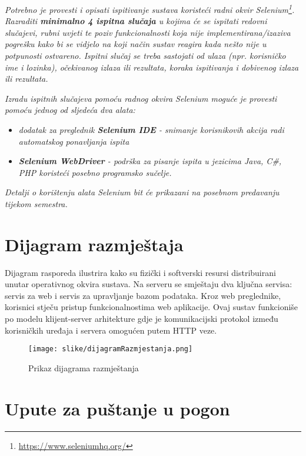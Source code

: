 			 \textit{Potrebno je provesti i opisati ispitivanje sustava koristeći radni okvir Selenium\footnote{\url{https://www.seleniumhq.org/}}. Razraditi \textbf{minimalno 4 ispitna slučaja} u kojima će se ispitati redovni slučajevi, rubni uvjeti te poziv funkcionalnosti koja nije implementirana/izaziva pogrešku kako bi se vidjelo na koji način sustav reagira kada nešto nije u potpunosti ostvareno. Ispitni slučaj se treba sastojati od ulaza (npr. korisničko ime i lozinka), očekivanog izlaza ili rezultata, koraka ispitivanja i dobivenog izlaza ili rezultata.\\ }
			 
			 \textit{Izradu ispitnih slučajeva pomoću radnog okvira Selenium moguće je provesti pomoću jednog od sljedeća dva alata:}
			 \begin{itemize}
			 	\item \textit{dodatak za preglednik \textbf{Selenium IDE} - snimanje korisnikovih akcija radi automatskog ponavljanja ispita	}
			 	\item \textit{\textbf{Selenium WebDriver} - podrška za pisanje ispita u jezicima Java, C\#, PHP koristeći posebno programsko sučelje.}
			 \end{itemize}
		 	\textit{Detalji o korištenju alata Selenium bit će prikazani na posebnom predavanju tijekom semestra.}
			
			\eject 
		
		
		\section{Dijagram razmještaja}
			
			Dijagram rasporeda ilustrira kako su fizički i softverski resursi distribuirani unutar operativnog okvira sustava. Na serveru se smještaju dva ključna servisa: servis za web i servis za upravljanje bazom podataka. Kroz web preglednike, korisnici stječu pristup funkcionalnostima web aplikacije. Ovaj sustav funkcioniše po modelu klijent-server arhitekture gdje je komunikacijski protokol između korisničkih uređaja i servera omogućen putem HTTP veze.

		\begin{figure} [H]
			\texttt{[image: slike/dijagramRazmjestanja.png]}
	        \centering
	        \caption{Prikaz dijagrama razmještanja}
	        \label{fig:Prikaz dijagrama razmještanja}
        \end{figure}

			\eject 
		
		\section{Upute za puštanje u pogon}

